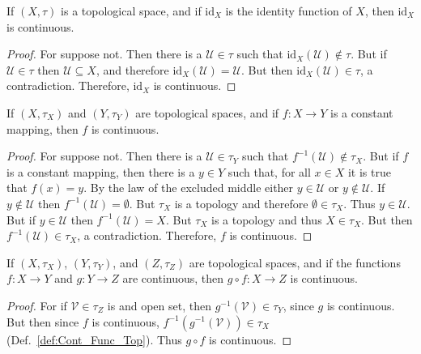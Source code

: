     \begin{theorem}
        If $(X,\tau)$ is a topological space, and if $\textrm{id}_{X}$ is the
        identity function of $X$, then $\textrm{id}_{X}$ is continuous.
    \end{theorem}
    \begin{proof}
        For suppose not. Then there is a $\mathcal{U}\in\tau$ such that
        $\textrm{id}_{X}(\mathcal{U})\notin\tau$. But if $\mathcal{U}\in\tau$
        then $\mathcal{U}\subseteq{X}$, and therefore
        $\textrm{id}_{X}(\mathcal{U})=\mathcal{U}$. But then
        $\textrm{id}_{X}(\mathcal{U})\in\tau$, a contradiction. Therefore,
        $\textrm{id}_{X}$ is continuous.
    \end{proof}
    \begin{theorem}
        If $(X,\tau_{X})$ and $(Y,\tau_{Y})$ are topological spaces, and if
        $f:X\rightarrow{Y}$ is a constant mapping, then $f$ is continuous.
    \end{theorem}
    \begin{proof}
        For suppose not. Then there is a $\mathcal{U}\in\tau_{Y}$ such that
        $f^{\minus{1}}(\mathcal{U})\notin\tau_{X}$. But if $f$ is a constant
        mapping, then there is a $y\in{Y}$ such that, for all $x\in{X}$ it is
        true that $f(x)=y$. By the law of the excluded middle either
        $y\in\mathcal{U}$ or $y\notin\mathcal{U}$. If $y\notin\mathcal{U}$ then
        $f^{\minus{1}}(\mathcal{U})=\emptyset$. But $\tau_{X}$ is a topology and
        therefore $\emptyset\in\tau_{X}$. Thus $y\in\mathcal{U}$. But if
        $y\in\mathcal{U}$ then $f^{\minus{1}}(\mathcal{U})=X$. But $\tau_{X}$ is
        a topology and thus $X\in\tau_{X}$. But then
        $f^{\minus{1}}(\mathcal{U})\in\tau_{X}$, a contradiction. Therefore,
        $f$ is continuous.
    \end{proof}
    \begin{theorem}
        If $(X,\tau_{X})$, $(Y,\tau_{Y})$, and $(Z,\tau_{Z})$ are topological
        spaces, and if the functions $f:X\rightarrow{Y}$ and $g:Y\rightarrow{Z}$
        are continuous, then $g\circ{f}:X\rightarrow{Z}$ is continuous.
    \end{theorem}
    \begin{proof}
        For if $\mathcal{V}\in\tau_{Z}$ is and open set, then
        $g^{\minus{1}}(\mathcal{V})\in\tau_{Y}$, since $g$ is continuous. But
        then since $f$ is continuous,
        $f^{\minus{1}}(g^{\minus{1}}(\mathcal{V}))\in\tau_{X}$
        (Def.~\ref{def:Cont_Func_Top}). Thus $g\circ{f}$ is continuous.
    \end{proof}
